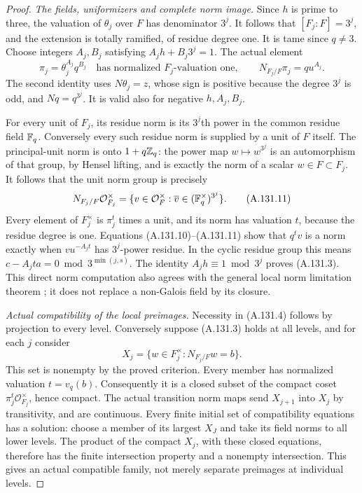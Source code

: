 \begin{proof}
\emph{The fields, uniformizers and complete norm image.}
Since \(h\) is prime to three, the valuation of
\(\theta_j\) over \(F\) has denominator \(3^j\).
It follows that \([F_j:F]=3^j\), and the extension is
totally ramified, of residue degree one.
It is tame since \(q\ne3\).
Choose integers \(A_j,B_j\) satisfying
\(A_jh+B_j3^j=1\).
The actual element
\[
       \pi_j=\theta_j^{A_j}q^{B_j}
               \quad\text{has normalized }F_j\text{-valuation one},
       \qquad N_{F_j/F}\pi_j=q u^{A_j}.
 \tag{A.131.10}
\]
The second identity uses
\(N\theta_j=z\), whose sign is positive because
the degree \(3^j\) is odd, and \(Nq=q^{3^j}\).
It is valid also for negative \(h,A_j,B_j\).

For every unit of \(F_j\), its residue norm is its
\(3^j\)th power in the common residue field \(\mathbb F_q\).
Conversely every such residue norm is supplied by a
unit of \(F\) itself.  The principal-unit norm is
onto \(1+q\mathbb Z_q\): the power map
\(w\mapsto w^{3^j}\) is an automorphism of that
group, by Hensel lifting, and is exactly the norm
of a scalar \(w\in F\subset F_j\).
It follows that the unit norm group is precisely
\[
 N_{F_j/F}\mathcal O_{F_j}^\times
     =\{v\in\mathcal O_F^\times:
                         \overline v\in(\mathbb F_q^\times)^{3^j}\}.
 \tag{A.131.11}
\]
Every element of \(F_j^\times\) is \(\pi_j^t\)
times a unit, and its norm has valuation \(t\),
because the residue degree is one.
Equations (A.131.10)--(A.131.11) show that
\(q^t v\) is a norm exactly when
\(v u^{-A_jt}\) has \(3^j\)-power residue.
In the cyclic residue group this means
\(c-A_jta=0\bmod3^{\min(j,s)}\).
The identity \(A_jh\equiv1\bmod3^j\) proves
(A.131.3).  This direct norm computation also
agrees with the general local norm limitation
theorem \cite[III, Theorem 3.5, pp.~108--109]{MilneCFT};
it does not replace a non-Galois field by its closure.

\emph{Actual compatibility of the local preimages.}
Necessity in (A.131.4) follows by projection to every
level.  Conversely suppose (A.131.3) holds at all
levels, and for each \(j\) consider
\[
       X_j=\{w\in F_j^\times:N_{F_j/F}w=b\}.
 \tag{A.131.12}
\]
This set is nonempty by the proved criterion.
Every member has normalized valuation \(t=v_q(b)\).
Consequently it is a closed subset of the compact
coset \(\pi_j^t\mathcal O_{F_j}^\times\), hence compact.
The actual transition norm maps send \(X_{j+1}\)
into \(X_j\) by transitivity, and are continuous.
Every finite initial set of compatibility equations
has a solution: choose a member of its largest
\(X_J\) and take its field norms to all lower levels.
The product of the compact \(X_j\), with these
closed equations, therefore has the finite intersection
property and a nonempty intersection.
This gives an actual compatible family, not merely
separate preimages at individual levels.


\end{proof}
